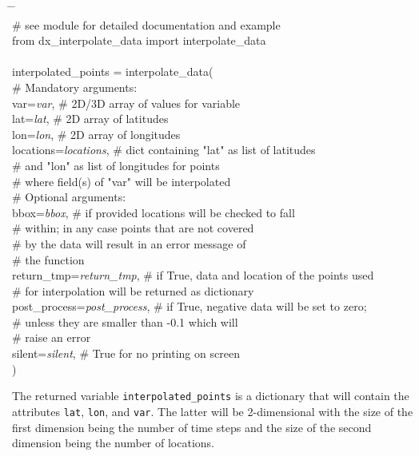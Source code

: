 \documentclass[10pt,a4paper,titlepage,parskip]{scrartcl}
\newenvironment{ttfont}{\fontfamily{\ttdefault}\selectfont}{\par}
\newcommand{\GRAU}[1]{\textcolor{ufzgray2}{#1}}
\begin{document}
\begin{framed}
	\vspace*{-1.2cm}
	\begin{ttfont}
		\begin{tabbing}
			\hspace{1.0cm} \= \hspace{4.7cm} \= \kill \\[4pt]
			\GRAU{\# see module for detailed documentation and example}\\
			from dx\_interpolate\_data import interpolate\_data\\
			\\
			interpolated\_points = interpolate\_data(\\
			\> \GRAU{\# Mandatory arguments:}\\
			\> var=\textit{var}, \> \GRAU{\# 2D/3D array of values for variable}\\
			\> lat=\textit{lat}, \> \GRAU{\# 2D array of latitudes}\\
			\> lon=\textit{lon}, \> \GRAU{\# 2D array of longitudes}\\
			\> locations=\textit{locations}, \> \GRAU{\# dict containing "lat" as list of latitudes}\\
			\> \> \GRAU{\# and "lon" as list of longitudes for points }\\
			\> \> \GRAU{\# where field(s) of "var" will be interpolated }\\
			\> \GRAU{\# Optional arguments:}\\
			\> bbox=\textit{bbox}, \> \GRAU{\# if provided locations will be checked to fall}\\
			\> \> \GRAU{\# within; in any case points that are not covered}\\
			\> \> \GRAU{\# by the data will result in an error message of}\\
			\> \> \GRAU{\# the function}\\
			\> return\_tmp=\textit{return\_tmp}, \> \GRAU{\# if True, data and location of the points used}\\
			\> \> \GRAU{\# for interpolation will be returned as dictionary}\\
			\> post\_process=\textit{post\_process}, \> \GRAU{\# if True, negative data will be set to zero;  }\\
			\> \> \GRAU{\# unless they are smaller than -0.1 which will}\\
			\> \> \GRAU{\# raise an error}\\
			\> silent=\textit{silent}, \> \GRAU{\# True for no printing on screen}\\
			\> ) \> 
		\end{tabbing}
	\end{ttfont}
	\vspace*{-0.3cm}
\end{framed}
\vspace*{-0.3cm}
The returned variable \texttt{interpolated\_points} is a dictionary that will contain the attributes \texttt{lat}, \texttt{lon}, and \texttt{var}. The latter will be 2-dimensional with the size of the first dimension being the number of time steps and the size of the second dimension being the number of locations. 
\end{document}
